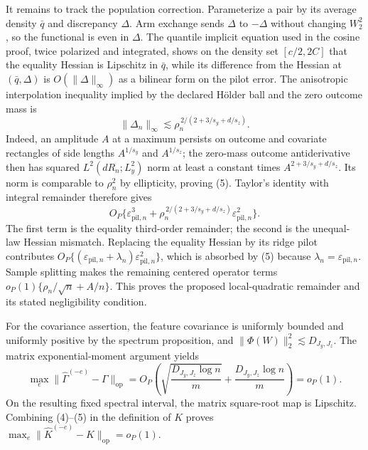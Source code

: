 It remains to track the population correction.  Parameterize a pair by its average density \(\bar q\) and discrepancy \(\Delta\).  Arm exchange sends \(\Delta\) to \(-\Delta\) without changing \(W_2^2\), so the functional is even in \(\Delta\).  The quantile implicit equation used in the cosine proof, twice polarized and integrated, shows on the density set \([c/2,2C]\) that the equality Hessian is Lipschitz in \(\bar q\), while its difference from the Hessian at \((\bar q,\Delta)\) is \(O(\|\Delta\|_\infty)\) as a bilinear form on the pilot error.  The anisotropic interpolation inequality implied by the declared H\"older ball and the zero outcome mass is
\[
 \|\Delta_n\|_\infty
 \lesssim \rho_n^{\,2/(2+3/s_y+d/s_z)}.                 \tag{5}
\]
Indeed, an amplitude \(A\) at a maximum persists on outcome and covariate rectangles of side lengths \(A^{1/s_y}\) and \(A^{1/s_z}\); the zero-mass outcome antiderivative then has squared \(L^2(dR_n;L^2_y)\) norm at least a constant times \(A^{2+3/s_y+d/s_z}\).  Its norm is comparable to \(\rho_n^2\) by ellipticity, proving (5).  Taylor's identity with integral remainder therefore gives
\[
 O_P\{\varepsilon_{\mathrm{pil},n}^3+
 \rho_n^{\,2/(2+3/s_y+d/s_z)}
 \varepsilon_{\mathrm{pil},n}^2\}.                       \tag{6}
\]
The first term is the equality third-order remainder; the second is the unequal-law Hessian mismatch.  Replacing the equality Hessian by its ridge pilot contributes \(O_P\{(\varepsilon_{\mathrm{pil},n}+\lambda_n)\varepsilon_{\mathrm{pil},n}^2\}\), which is absorbed by (5) because \(\lambda_n=\varepsilon_{\mathrm{pil},n}\).  Sample splitting makes the remaining centered operator terms \(o_P(1)\{\rho_n/\sqrt n+A/n\}\).  This proves the proposed local-quadratic remainder and its stated negligibility condition.

For the covariance assertion, the feature covariance is uniformly bounded and uniformly positive by the spectrum proposition, and \(\|\Phi(W)\|_2^2\lesssim D_{J_y,J_z}\).  The matrix exponential-moment argument yields
\[
 \max_e\|\widehat\Gamma^{(-e)}-\Gamma\|_{\mathrm{op}}
 =O_P\!\left(\sqrt{\frac{D_{J_y,J_z}\log n}{m}}+
 \frac{D_{J_y,J_z}\log n}{m}\right)=o_P(1).            \tag{5}
\]
On the resulting fixed spectral interval, the matrix square-root map is Lipschitz.  Combining (4)--(5) in the definition of \(K\) proves \(\max_e\|\widehat K^{(-e)}-K\|_{\mathrm{op}}=o_P(1)\).